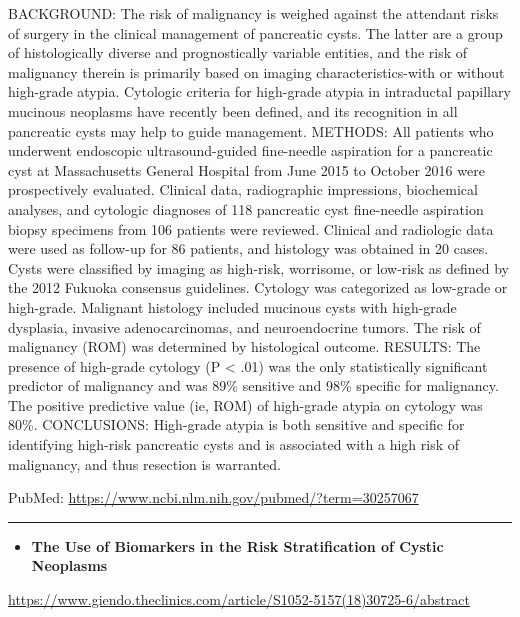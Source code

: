 \documentclass[]{article}
\providecommand{\tightlist}{%
  \setlength{\itemsep}{0pt}\setlength{\parskip}{0pt}}
\begin{document}
BACKGROUND: The risk of malignancy is weighed against the attendant
risks of surgery in the clinical management of pancreatic cysts. The
latter are a group of histologically diverse and prognostically variable
entities, and the risk of malignancy therein is primarily based on
imaging characteristics-with or without high-grade atypia. Cytologic
criteria for high-grade atypia in intraductal papillary mucinous
neoplasms have recently been defined, and its recognition in all
pancreatic cysts may help to guide management. METHODS: All patients who
underwent endoscopic ultrasound-guided fine-needle aspiration for a
pancreatic cyst at Massachusetts General Hospital from June 2015 to
October 2016 were prospectively evaluated. Clinical data, radiographic
impressions, biochemical analyses, and cytologic diagnoses of 118
pancreatic cyst fine-needle aspiration biopsy specimens from 106
patients were reviewed. Clinical and radiologic data were used as
follow-up for 86 patients, and histology was obtained in 20 cases. Cysts
were classified by imaging as high-risk, worrisome, or low-risk as
defined by the 2012 Fukuoka consensus guidelines. Cytology was
categorized as low-grade or high-grade. Malignant histology included
mucinous cysts with high-grade dysplasia, invasive adenocarcinomas, and
neuroendocrine tumors. The risk of malignancy (ROM) was determined by
histological outcome. RESULTS: The presence of high-grade cytology (P
\textless{} .01) was the only statistically significant predictor of
malignancy and was 89\% sensitive and 98\% specific for malignancy. The
positive predictive value (ie, ROM) of high-grade atypia on cytology was
80\%. CONCLUSIONS: High-grade atypia is both sensitive and specific for
identifying high-risk pancreatic cysts and is associated with a high
risk of malignancy, and thus resection is warranted.

PubMed: \url{https://www.ncbi.nlm.nih.gov/pubmed/?term=30257067}

{}

{}

\begin{center}\rule{0.5\linewidth}{\linethickness}\end{center}

\begin{itemize}
\tightlist
\item
  \textbf{The Use of Biomarkers in the Risk Stratification of Cystic
  Neoplasms}
\end{itemize}

\url{https://www.giendo.theclinics.com/article/S1052-5157(18)30725-6/abstract}
\end{document}
